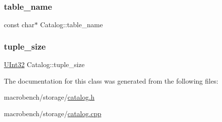 \mbox{\label{classCatalog_aa6c66c1e792e3c6081e22fd669f84052}} 
\subsubsection{\texorpdfstring{table\+\_\+name}{table\_name}}
{\footnotesize\ttfamily const char$\ast$ Catalog\+::table\+\_\+name}

\mbox{\label{classCatalog_ac5c0f579ade64940d1c743b4ee76e657}} 
\subsubsection{\texorpdfstring{tuple\+\_\+size}{tuple\_size}}
{\footnotesize\ttfamily \hyperlink{global_8h_a7e8aeec7b6541935dfc6f608cd5170ce}{U\+Int32} Catalog\+::tuple\+\_\+size}



The documentation for this class was generated from the following files\+:\begin{DoxyCompactItemize}
\item 
macrobench/storage/\hyperlink{catalog_8h}{catalog.\+h}\item 
macrobench/storage/\hyperlink{catalog_8cpp}{catalog.\+cpp}\end{DoxyCompactItemize}
